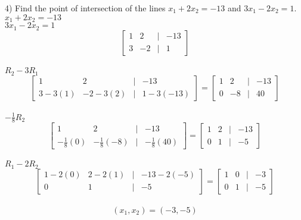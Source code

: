 \documentclass[]{article}
\begin{document}
4) Find the point of intersection of the lines $x_1+2x_2=-13$ and $3x_1-2x_2=1$.\\
$x_1+2x_2=-13$\\
$3x_1-2x_2 = 1$\\
\[
\begin{bmatrix}
	1&2&|&-13\\
	3&-2&|&1
\end{bmatrix}
\]\\
$R_2-3R_1$
\[
\begin{bmatrix}
	1&2&|&-13\\
	3-3(1)&-2-3(2)&|&1-3(-13)
\end{bmatrix}=
\begin{bmatrix}
	1&2&|&-13\\
	0&-8&|&40
\end{bmatrix}
\]\\
$-\frac{1}{8}R_2$
\[
\begin{bmatrix}
	1&2&|&-13\\
	-\frac{1}{8}(0)&-\frac{1}{8}(-8)&|&-\frac{1}{8}(40)
\end{bmatrix}=
\begin{bmatrix}
	1&2&|&-13\\
	0&1&|&-5
\end{bmatrix}
\]\\
$R_1-2R_2$
\[
\begin{bmatrix}
	1-2(0)&2-2(1)&|&-13-2(-5)\\
	0&1&|&-5
\end{bmatrix}=
\begin{bmatrix}
	1&0&|&-3\\
	0&1&|&-5
\end{bmatrix}
\]\\
$$(x_1, x_2) = (-3, -5)$$\\
\end{document}
